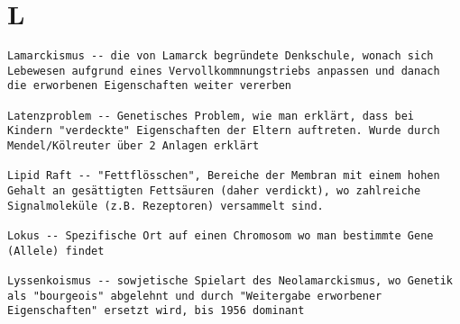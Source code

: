 \documentclass{article}
\begin{document}
\section{L}
\begin{verbatim}
Lamarckismus -- die von Lamarck begründete Denkschule, wonach sich Lebewesen aufgrund eines Vervollkommnungstriebs anpassen und danach die erworbenen Eigenschaften weiter vererben

Latenzproblem -- Genetisches Problem, wie man erklärt, dass bei Kindern "verdeckte" Eigenschaften der Eltern auftreten. Wurde durch Mendel/Kölreuter über 2 Anlagen erklärt

Lipid Raft -- "Fettflösschen", Bereiche der Membran mit einem hohen Gehalt an gesättigten Fettsäuren (daher verdickt), wo zahlreiche Signalmoleküle (z.B. Rezeptoren) versammelt sind.

Lokus -- Spezifische Ort auf einen Chromosom wo man bestimmte Gene (Allele) findet

Lyssenkoismus -- sowjetische Spielart des Neolamarckismus, wo Genetik als "bourgeois" abgelehnt und durch "Weitergabe erworbener Eigenschaften" ersetzt wird, bis 1956 dominant
\end{verbatim}
\newpage
\end{document}
